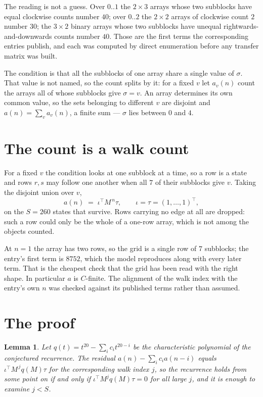 \documentclass[11pt,a4paper]{article}
\theoremstyle{plain}
\newtheorem{lemma}[theorem]{Lemma}
\theoremstyle{definition}
\begin{document}
The reading is not a guess. Over $0..1$ the $2\times3$ arrays whose two subblocks have equal
clockwise counts number $40$; over $0..2$ the $2\times2$ arrays of clockwise count $2$ number
$30$; the $3\times2$ binary arrays whose two subblocks have unequal rightwards-and-downwards
counts number $40$. Those are the first terms the corresponding entries publish, and each was
computed by direct enumeration before any transfer matrix was built.

The condition is that all the subblocks of one array share a single value of $\sigma$. That
value is not named, so the count splits by it: for a fixed $v$ let $a_v(n)$ count the arrays all
of whose subblocks give $\sigma=v$. An array determines its own common value, so the sets
belonging to different $v$ are disjoint and $a(n)=\sum_v a_v(n)$, a finite sum --- $\sigma$
lies between $0$ and $4$.

\section{The count is a walk count}

For a fixed $v$ the condition looks at one subblock at a time, so a row is
a state and rows $r,s$ may follow one another when all $7$ of their subblocks give $v$.
Taking the disjoint union over $v$,
\[
a(n)\;=\;\iota^{\!\top}M^{\,n}\tau,\qquad\iota=\tau=(1,\dots,1)^{\!\top},
\]
on the $S=260$ states that survive. Rows carrying no edge at all are dropped: such a row could
only be the whole of a one-row array, which is not among the objects counted.

At $n=1$ the array has two rows, so the grid is a single row of $7$
subblocks; the entry's first term is $8752$, which the model
reproduces along with every later term. That is the cheapest check that the grid has been read
with the right shape.
In particular $a$ is $C$-finite. The alignment of the walk index with the entry's own $n$ was
checked against its published terms rather than assumed.

\section{The proof}

\begin{lemma}\label{lem:crit}
Let $q(t)=t^{20}-\sum_i c_it^{20-i}$ be the characteristic polynomial of the
conjectured recurrence. The residual $a(n)-\sum_ic_ia(n-i)$ equals
$\iota^{\!\top}M^{\,j}q(M)\tau$ for the corresponding walk index $j$, so the recurrence
holds from some point on if and only if $\iota^{\!\top}M^{j}q(M)\tau=0$ for all large $j$,
and it is enough to examine $j<S$.
\end{lemma}
\end{document}
